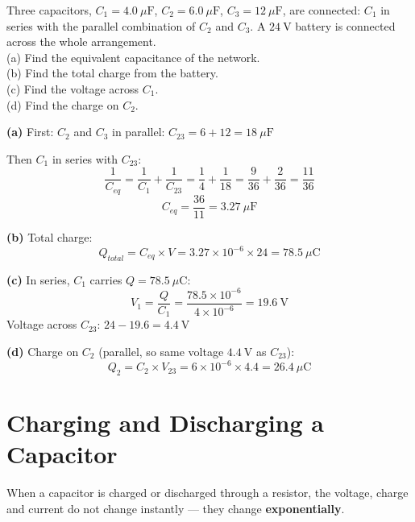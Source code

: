 \begin{examplebox}[22.3]
Three capacitors, $C_1 = 4.0\ \mu\text{F}$,
$C_2 = 6.0\ \mu\text{F}$, $C_3 = 12\ \mu\text{F}$,
are connected: $C_1$ in series with the parallel
combination of $C_2$ and $C_3$. A $24\ \text{V}$
battery is connected across the whole arrangement.\\
(a) Find the equivalent capacitance of the network.\\
(b) Find the total charge from the battery.\\
(c) Find the voltage across $C_1$.\\
(d) Find the charge on $C_2$.
\end{examplebox}

\begin{solutionbox}
\textbf{(a)} First: $C_2$ and $C_3$ in parallel:
$C_{23} = 6 + 12 = 18\ \mu\text{F}$

Then $C_1$ in series with $C_{23}$:
\[
  \frac{1}{C_{eq}} = \frac{1}{C_1}
  + \frac{1}{C_{23}} = \frac{1}{4} + \frac{1}{18}
  = \frac{9}{36} + \frac{2}{36} = \frac{11}{36}
\]
\[
  C_{eq} = \frac{36}{11} = 3.27\ \mu\text{F}
\]

\textbf{(b)} Total charge:
\[
  Q_{total} = C_{eq} \times V
  = 3.27\times10^{-6} \times 24
  = 78.5\ \mu\text{C}
\]

\textbf{(c)} In series, $C_1$ carries
$Q = 78.5\ \mu\text{C}$:
\[
  V_1 = \frac{Q}{C_1}
  = \frac{78.5\times10^{-6}}{4\times10^{-6}}
  = 19.6\ \text{V}
\]
Voltage across $C_{23}$: $24 - 19.6 = 4.4\ \text{V}$

\textbf{(d)} Charge on $C_2$ (parallel, so same
voltage $4.4\ \text{V}$ as $C_{23}$):
\[
  Q_2 = C_2 \times V_{23}
  = 6\times10^{-6} \times 4.4
  = 26.4\ \mu\text{C}
\]
\end{solutionbox}

\section{Charging and Discharging a Capacitor}

When a capacitor is charged or discharged through a
resistor, the voltage, charge and current do not change
instantly --- they change \textbf{exponentially}.

